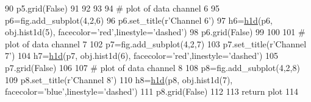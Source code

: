 \begin{DoxyCode}
90     p5.grid(\textcolor{keyword}{False})
91 
92 
93 
94     \textcolor{comment}{# plot of data channel 6}
95     p6=fig.add\_subplot(4,2,6)
96     p6.set\_title(\textcolor{stringliteral}{r'Channel 6'})
97     h6=\hyperlink{namespaceplotter_a5d9521541ff0c72bf439078efacf2f42}{h1d}(p6, obj.hist1d(5), facecolor=\textcolor{stringliteral}{'red'},linestyle=\textcolor{stringliteral}{'dashed'})
98     p6.grid(\textcolor{keyword}{False})
99 
100 
101     \textcolor{comment}{# plot of data channel 7}
102     p7=fig.add\_subplot(4,2,7)
103     p7.set\_title(\textcolor{stringliteral}{r'Channel 7'})
104     h7=\hyperlink{namespaceplotter_a5d9521541ff0c72bf439078efacf2f42}{h1d}(p7, obj.hist1d(6), facecolor=\textcolor{stringliteral}{'red'},linestyle=\textcolor{stringliteral}{'dashed'})
105     p7.grid(\textcolor{keyword}{False})
106 
107     \textcolor{comment}{# plot of data channel 8}
108     p8=fig.add\_subplot(4,2,8)
109     p8.set\_title(\textcolor{stringliteral}{r'Channel 8'})
110     h8=\hyperlink{namespaceplotter_a5d9521541ff0c72bf439078efacf2f42}{h1d}(p8, obj.hist1d(7), facecolor=\textcolor{stringliteral}{'blue'},linestyle=\textcolor{stringliteral}{'dashed'})
111     p8.grid(\textcolor{keyword}{False})
112 
113     \textcolor{keywordflow}{return} plot
114 \end{DoxyCode}
